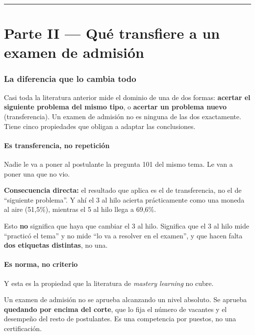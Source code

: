 \documentclass[11pt,a4paper]{article}
\begin{document}
\vspace{14pt}
\hrule
\vspace{14pt}

\part*{Parte II --- Qué transfiere a un examen de admisión}

\section{La diferencia que lo cambia todo}

Casi toda la literatura anterior mide el dominio de una de dos formas: \textbf{acertar el siguiente problema del mismo tipo}, o \textbf{acertar un problema nuevo} (transferencia). Un examen de admisión no es ninguna de las dos exactamente. Tiene cinco propiedades que obligan a adaptar las conclusiones.

\subsection{Es transferencia, no repetición}

Nadie le va a poner al postulante la pregunta 101 del mismo tema. Le van a poner una que no vio.

\textbf{Consecuencia directa:} el resultado que aplica es el de transferencia, no el de ``siguiente problema''. Y ahí el 3 al hilo acierta prácticamente como una moneda al aire (51{,}5\%), mientras el 5 al hilo llega a 69{,}6\%.

Esto \textbf{no} significa que haya que cambiar el 3 al hilo. Significa que el 3 al hilo mide ``practicó el tema'' y no mide ``lo va a resolver en el examen'', y que hacen falta \textbf{dos etiquetas distintas}, no una.

\subsection{Es norma, no criterio}

Y esta es la propiedad que la literatura de \emph{mastery learning} no cubre.

Un examen de admisión no se aprueba alcanzando un nivel absoluto. Se aprueba \textbf{quedando por encima del corte}, que lo fija el número de vacantes y el desempeño del resto de postulantes. Es una competencia por puestos, no una certificación.
\end{document}
